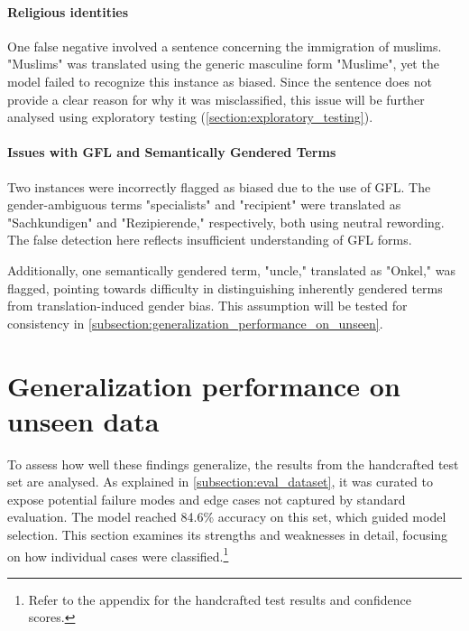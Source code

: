     \paragraph{Religious identities}
    
    One false negative involved a sentence concerning the immigration of muslims. "Muslims" was translated using the generic masculine form "Muslime", yet the model failed to recognize this instance as biased. Since the sentence does not provide a clear reason for why it was misclassified, this issue will be further analysed using exploratory testing (\autoref{section:exploratory_testing}).

    \paragraph{Issues with GFL and Semantically Gendered Terms}

    Two instances were incorrectly flagged as biased due to the use of GFL. The gender-ambiguous terms "specialists" and "recipient" were translated as "Sachkundigen" and "Rezipierende," respectively, both using neutral rewording. The false detection here reflects insufficient understanding of GFL forms.

    Additionally, one semantically gendered term, "uncle," translated as "Onkel," was flagged, pointing towards difficulty in distinguishing inherently gendered terms from translation-induced gender bias. This assumption will be tested for consistency in \autoref{subsection:generalization_performance_on_unseen}.

\section{Generalization performance on unseen data} \label{subsection:generalization_performance_on_unseen}
    To assess how well these findings generalize, the results from the handcrafted test set are analysed. As explained in \autoref{subsection:eval_dataset}, it was curated to expose potential failure modes and edge cases not captured by standard evaluation. The model reached 84.6\% accuracy on this set, which guided model selection. This section examines its strengths and weaknesses in detail, focusing on how individual cases were classified.\footnote{Refer to the appendix for the handcrafted test results and confidence scores.}

